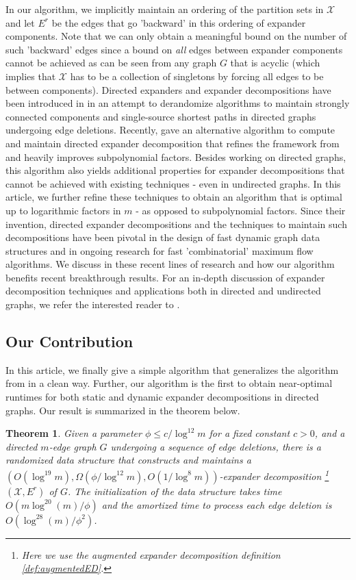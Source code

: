 \documentclass[11pt]{article}
\newtheorem{theorem}{Theorem}[section]
\begin{document}
In our algorithm, we implicitly maintain an ordering of the partition sets in $\mathcal{X}$ and let $E^r$ be the edges that go 'backward' in this ordering of expander components. Note that we can only obtain a meaningful bound on the number of such 'backward' edges since a bound on \emph{all} edges between expander components cannot be achieved as can be seen from any graph $G$ that is acyclic (which implies that $\mathcal{X}$ has to be a collection of singletons by   forcing all edges to be between components). Directed expanders and expander decompositions have been introduced in \cite{bernstein2020deterministic} in an attempt to derandomize algorithms to maintain strongly connected components and single-source shortest paths in directed graphs undergoing edge deletions. Recently, \cite{hua2023maintaining} gave an alternative algorithm to compute and maintain directed expander decomposition that refines the framework from \cite{bernstein2020deterministic} and heavily improves subpolynomial factors. Besides working on directed graphs, this algorithm also yields additional properties for expander decompositions that cannot be achieved with existing techniques - even in undirected graphs. In this article, we further refine these techniques to obtain an algorithm that is optimal up to logarithmic factors in $m$ - as opposed to subpolynomial factors. Since their invention, directed expander decompositions and the techniques to maintain such decompositions have been pivotal in the design of fast dynamic graph data structures and in ongoing research for fast 'combinatorial' maximum flow algorithms. We discuss in  these recent lines of research and how our algorithm benefits recent breakthrough results. For an in-depth discussion of expander decomposition techniques and applications both in directed and undirected graphs, we refer the interested reader to .

\subsection{Our Contribution} 
In this article, we finally give a simple algorithm that generalizes the algorithm from \cite{saranurak2019expander} in a clean way. Further, our algorithm is the first to obtain near-optimal runtimes for both static and dynamic expander decompositions in directed graphs. Our result is summarized in the theorem below.

\begin{theorem}\label{Main-thm}Given a parameter $\phi \leq c/ \log^{12} m$ for a fixed constant $c > 0$, and a directed $m$-edge graph $G$ undergoing a sequence of edge deletions, there is a randomized data structure that constructs and maintains a $(O(\log^{19} m), \Omega(\phi/\log^{12} m), O(1/\log^8 m))$-expander decomposition \footnote{Here we use the augmented expander decomposition definition \ref{def:augmentedED}.} $(\mathcal{X}, E^r)$ of $G$. The initialization of the data structure takes time $O(m \log^{20}(m)/\phi)$ and the amortized time to process each edge deletion is $O(\log^{28}(m)/\phi^2)$.
\end{theorem} 
\end{document}
